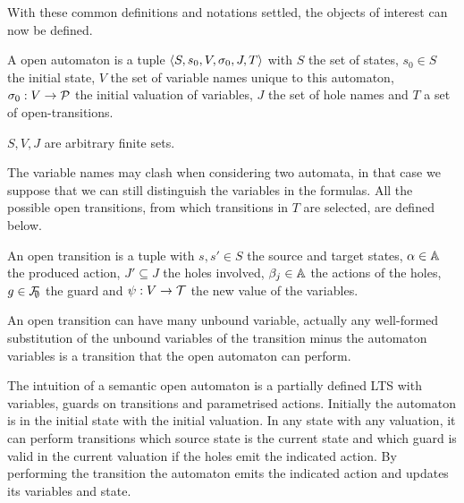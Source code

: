 \documentclass{article}
\begin{document}
With these common definitions and notations settled, the objects of interest can now be defined.
\begin{defi}
A open automaton is a tuple \(\left<S,s_0,V,\sigma_0,J,T\right>\) with \(S\) the set of states, \(s_0 \in S\) the initial state, \(V\) the set of variable names unique to this automaton, \(\sigma_0: V \to \mathcal{P}\) the initial valuation of variables, \(J\) the set of hole names and \(T\) a set of open-transitions.

\(S, V, J\) are arbitrary finite sets.
\end{defi}
The variable names may clash when considering two automata, in that case we suppose that we can still distinguish the variables in the formulas.
All the possible open transitions, from which transitions in \(T\) are selected, are defined below.
\begin{defi}
An open transition is a tuple \nmm{\OTg} with \(s, s' \in S\) the source and target states, \(\alpha \in {\mathbb{A}}\) the produced action, \(J' \subseteq J\) the holes involved, \(\beta_j \in {\mathbb{A}}\) the actions of the holes, \(g \in {\mathcal{F}}_{\!\!\emptyset}\) the guard and \(\psi: V \to {\mathcal{T}}\) the new value of the variables.
\end{defi}
An open transition can have many unbound variable, actually any well-formed substitution of the unbound variables of the transition minus the automaton variables is a transition that the open automaton can perform.

The intuition of a semantic open automaton is a partially defined LTS with variables, guards on transitions and parametrised actions.
Initially the automaton is in the initial state with the initial valuation.
In any state with any valuation, it can perform transitions which source state is the current state and which guard is valid in the current valuation if the holes emit the indicated action.
By performing the transition the automaton emits the indicated action and updates its variables and state.
\end{document}
